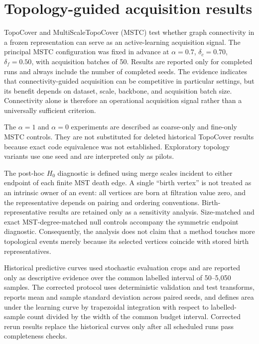\section{Topology-guided acquisition results}
TopoCover and MultiScaleTopoCover (MSTC) test whether graph connectivity in a frozen representation can serve as an active-learning acquisition signal. The principal MSTC configuration was fixed in advance at $\alpha=0.7$, $\delta_c=0.70$, $\delta_f=0.50$, with acquisition batches of 50. Results are reported only for completed runs and always include the number of completed seeds. The evidence indicates that connectivity-guided acquisition can be competitive in particular settings, but its benefit depends on dataset, scale, backbone, and acquisition batch size. Connectivity alone is therefore an operational acquisition signal rather than a universally sufficient criterion.

The $\alpha=1$ and $\alpha=0$ experiments are described as coarse-only and fine-only MSTC controls. They are not substituted for deleted historical TopoCover results because exact code equivalence was not established. Exploratory topology variants use one seed and are interpreted only as pilots.

The post-hoc $H_0$ diagnostic is defined using merge scales incident to either endpoint of each finite MST death edge. A single ``birth vertex'' is not treated as an intrinsic owner of an event: all vertices are born at filtration value zero, and the representative depends on pairing and ordering conventions. Birth-representative results are retained only as a sensitivity analysis. Size-matched and exact MST-degree-matched null controls accompany the symmetric endpoint diagnostic. Consequently, the analysis does not claim that a method touches more topological events merely because its selected vertices coincide with stored birth representatives.

Historical predictive curves used stochastic evaluation crops and are reported only as descriptive evidence over the common labelled interval of 50--5,050 samples. The corrected protocol uses deterministic validation and test transforms, reports mean and sample standard deviation across paired seeds, and defines area under the learning curve by trapezoidal integration with respect to labelled-sample count divided by the width of the common budget interval. Corrected rerun results replace the historical curves only after all scheduled runs pass completeness checks.
